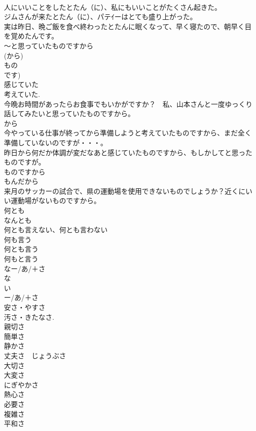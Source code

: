 \documentclass[8pt]{extreport}
\begin{document}
\begin{CJK}{UTF8}{min}
\\	人にいいことをしたとたん（に）、私にもいいことがたくさん起きた。
\\	ジムさんが来たとたん（に）、パテｲーはとても盛り上がった。
\\	実は昨日、晩ご飯を食べ終わったとたんに眠くなって、早く寝たので、朝早く目を覚めたんです。
\\	～と思っていたものですから
\\	(から) 
\\	もの
\\	です) 
\\	感じていた 
\\	考えていた.
\\	今晩お時間があったらお食事でもいかがですか？　私、山本さんと一度ゆっくり話してみたいと思っていたものですから。
\\	から 
\\	今やっている仕事が終ってから準備しようと考えていたものですから、まだ全く準備していないのですが・・・。
\\	昨日から何だか体調が変だなあと感じていたものですから、もしかしてと思ったものですが。
\\	ものですから
\\	もんだから
\\	来月のサッカーの試合で、県の運動場を使用できないものでしょうか？近くにいい運動場がないものですから。
\\	何とも
\\	なんとも
\\	何とも言えない、何とも言わない
\\	何も言う　
\\	何とも言う　
\\	何もと言う　
\\	なー/あ/＋さ
\\	な 
\\	い
\\	ー/あ/＋さ 
\\	安さ・やすさ 
\\	汚さ・きたなさ.
\\	親切さ
\\	簡単さ
\\	静かさ
\\	丈夫さ　じょうぶさ
\\	大切さ
\\	大変さ
\\	にぎやかさ
\\	熱心さ
\\	必要さ
\\	複雑さ
\\	平和さ

\end{CJK}
\end{document}
